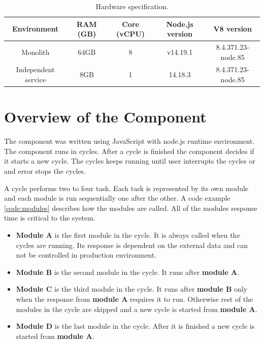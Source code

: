 \begin{table}[h!]
    \begin{tabular}{|c|c|c|c|c|} 
        \hline
        Environment
        & RAM (GB)
        & Core (vCPU)
        & Node.js version
        & V8 version
        \\ 
        \hline\hline
        Monolith
        & 64GB
        & 8
        & v14.19.1
        & 8.4.371.23-node.85
        \\
        Independent service
        & 8GB
        & 1
        & 14.18.3
        & 8.4.371.23-node.85
        \\
        \hline
    \end{tabular}    
    \caption{Hardware specification.}
    \label{represented:harware:specs}
\end{table}

\section{Overview of the Component}
The component was written using JavaScript with node.js runtime environment.
The component runs in cycles.
After a cycle is finished the component decides if it starts a new cycle.
The cycles keeps running until user interrupts the cycles or and error stops the cycles.

A cycle performs two to four task.
Each task is represented by its own module and each module is run sequentially one after the other.
A code example \ref{code:modules} describes how the modules are called.
All of the modules response time is critical to the system.
\begin{itemize}
    \item
    \textbf{Module A} is the first module in the cycle.
    It is always called when the cycles are running. Its response is dependent on the external data and can not be controlled in production environment.
    
    \item
    \textbf{Module B} is the second module in the cycle.
    It runs after \textbf{module A}.
    
    \item
    \textbf{Module C} is the third module in the cycle.
    It runs after \textbf{module B} only when the response from \textbf{module A} requires it to run.
    Otherwise rest of the modules in the cycle are skipped and a new cycle is started from \textbf{module A}.

    \item
    \textbf{Module D} is the last module in the cycle.
    After it is finished a new cycle is started from \textbf{module A}.
\end{itemize}

